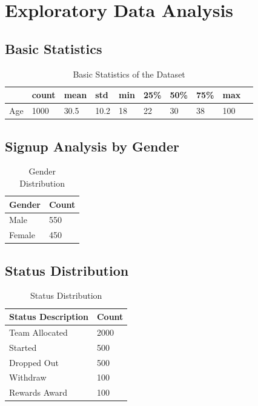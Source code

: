 \documentclass{article}
\begin{document}
\section{Exploratory Data Analysis}

\subsection{Basic Statistics}
\begin{table}[H]
    \centering
    \begin{tabular}{llllllllll}
        \toprule
        & count & mean & std & min & 25\% & 50\% & 75\% & max \\
        \midrule
        Age & 1000 & 30.5 & 10.2 & 18 & 22 & 30 & 38 & 100 \\
        \bottomrule
    \end{tabular}
    \caption{Basic Statistics of the Dataset}
\end{table}

\subsection{Signup Analysis by Gender}
\begin{table}[H]
    \centering
    \begin{tabular}{ll}
        \toprule
        Gender & Count \\
        \midrule
        Male & 550 \\
        Female & 450 \\
        \bottomrule
    \end{tabular}
    \caption{Gender Distribution}
\end{table}

\subsection{Status Distribution}
\begin{table}[H]
    \centering
    \begin{tabular}{ll}
        \toprule
        Status Description & Count \\
        \midrule
        Team Allocated & 2000 \\
        Started & 500 \\
        Dropped Out & 500 \\
        Withdraw & 100 \\
        Rewards Award & 100 \\
        \bottomrule
    \end{tabular}
    \caption{Status Distribution}
\end{table}
\end{document}
